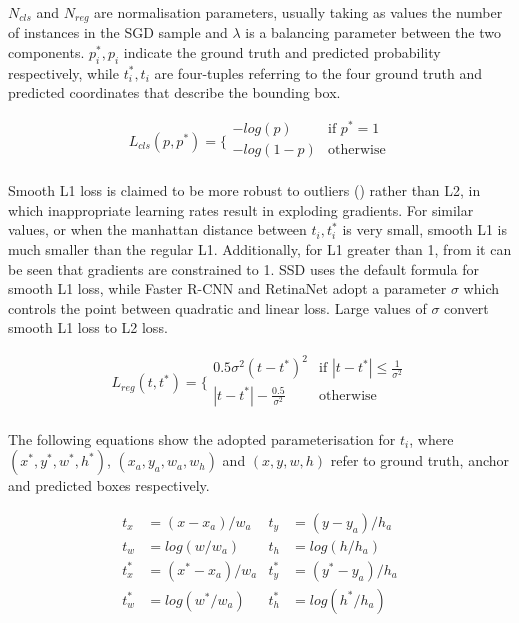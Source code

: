 $N_{cls}$ and $N_{reg}$ are normalisation parameters, usually taking as values the number of instances in the SGD sample and $\lambda$ is a balancing parameter between the two components. $p_i^*, p_i$ indicate the ground truth and predicted probability respectively, while $t_i^*, t_i$ are four-tuples referring to the four ground truth and predicted coordinates that describe the bounding box.

\begin{equation}
    L_{cls}(p,p^*)= \bigg\{
    \begin{array}{ll}
      -log(p) & \text{if } p^*=1 \\
      -log(1-p) &  \text{otherwise}\\
    \end{array}
\end{equation}

Smooth L1 loss is claimed to be more robust to outliers (\cite{ren2015faster}) rather than L2, in which inappropriate learning rates result in exploding gradients. For similar values, or when the manhattan distance between $t_i, t_i^*$ is very small, smooth L1 is much smaller than the regular L1. Additionally, for L1 greater than 1, from  it can be seen that gradients are constrained to 1. SSD uses the default formula for smooth L1 loss, while Faster R-CNN and RetinaNet adopt a parameter $\sigma$ which controls the point between quadratic and linear loss. Large values of $\sigma$ convert smooth L1 loss to L2 loss.

\begin{equation}
    L_{reg}(t,t^*)= \bigg\{
    \begin{array}{ll}
      0.5\sigma^2(t-t^*)^2 & \text{if } |t-t^*|\leq \frac{1}{\sigma^2} \\
      |t-t^*|-\frac{0.5}{\sigma^2} &  \text{otherwise} \\
    \end{array}
    \label{smooth_l1}
\end{equation}

The following equations show the adopted parameterisation for $t_i$, where $(x^*,y^*,w^*,h^*)$, $(x_a,y_a,w_a,w_h)$ and $(x,y,w,h)$ refer to ground truth, anchor and predicted boxes respectively. 

\begin{align}
t_x		&= (x-x_a)/w_a			&		t_y	&= (y-y_a)/h_a \\
t_w		&= log(w/w_a)			&		t_h 	&= log(h/h_a) \\
t_x^*		&= (x^*-x_a)/w_a		&		t_y^*	&= (y^*-y_a)/h_a \\
t_w^*	&= log(w^*/w_a)		&		t_h^*	&= log(h^*/h_a) 
\end{align}

